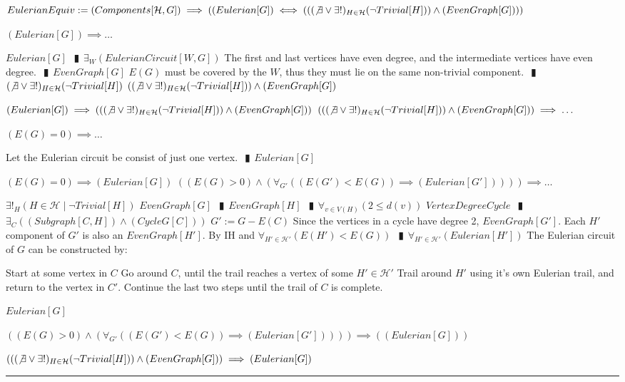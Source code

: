 \documentclass{book}
\newcommand{\abr}{:=}
\newcommand{\pipe}{$\phantom{(}\vrectangleblack\phantom{)}$}
\newcommand{\pr}[1]{\left(#1\right)}
\newcommand{\st}{\mathbin{|}}
\begin{document}
$EulerianEquiv \abr (Components[\mathcal{H}, G]) \implies \pr{(Eulerian[G]) \iff \pr{\pr{(\not \exists \lor \exists!)_{H \in \mathcal{H}}(\lnot Trivial[H])} \land (EvenGraph[G])}}$
\begin{enumerate}
  \lit $(Eulerian[G]) \implies \ldots$
  \begin{enumerate}
    \lit $Eulerian[G]$ \pipe $\exists_{W}(EulerianCircuit[W, G])$
    \lit The first and last vertices have even degree, and the intermediate vertices have even degree. \pipe $EvenGraph[G]$
    \lit $E(G)$ must be covered by the $W$, thus they must lie on the same non-trivial component. \pipe $(\not \exists \lor \exists!)_{H \in \mathcal{H}}(\lnot Trivial[H])$
    \lit $\pr{(\not \exists \lor \exists!)_{H \in \mathcal{H}}(\lnot Trivial[H])} \land (EvenGraph[G])$
  \end{enumerate}
  \lit $(Eulerian[G]) \implies \pr{\pr{(\not \exists \lor \exists!)_{H \in \mathcal{H}}(\lnot Trivial[H])} \land (EvenGraph[G])}$
  \lit $\pr{\pr{(\not \exists \lor \exists!)_{H \in \mathcal{H}}(\lnot Trivial[H])} \land (EvenGraph[G])} \implies \ldots$
  \begin{enumerate}
    \lit $\pr{E(G) = 0} \implies \ldots$
    \begin{enumerate}
      \lit Let the Eulerian circuit be consist of just one vertex. \pipe $Eulerian[G]$
    \end{enumerate}
    \lit $\pr{E(G) = 0} \implies (Eulerian[G])$
    \lit $\pr{\pr{E(G) > 0} \land \pr{\forall_{G'}\pr{\pr{E(G') < E(G)} \implies (Eulerian[G'])}}} \implies \ldots$
    \begin{enumerate}
      \lit $\exists!_{H}(H \in \mathcal{H} \st \lnot Trivial[H])$
      \lit $EvenGraph[G]$ \pipe $EvenGraph[H]$ \pipe $\forall_{v \in V(H)}\pr{2 \leq d(v)}$
      \lit $VertexDegreeCycle$ \pipe $\exists_{C}\pr{(Subgraph[C, H]) \land (CycleG[C])}$
      \lit $G' \abr G - E(C)$
      \lit Since the vertices in a cycle have degree 2, $EvenGraph[G']$. Each $H'$ component of $G'$ is also an $EvenGraph[H']$.
      \lit By IH and $\forall_{H' \in \mathcal{H}'}\pr{E(H') < E(G)}$ \pipe $\forall_{H' \in \mathcal{H}'}(Eulerian[H'])$
      \lit The Eulerian circuit of $G$ can be constructed by:
      \begin{enumerate}
        \lit Start at some vertex in $C$
        \lit Go around $C$, until the trail reaches a vertex of some $H' \in \mathcal{H}'$
        \lit Trail around $H'$ using it's own Eulerian trail, and return to the vertex in $C'$.
        \lit Continue the last two steps until the trail of $C$ is complete.
      \end{enumerate}
      \lit $Eulerian[G]$
    \end{enumerate}
    \lit $\pr{\pr{E(G) > 0} \land \pr{\forall_{G'}\pr{\pr{E(G') < E(G)} \implies (Eulerian[G'])}}} \implies \pr{(Eulerian[G])}$
  \end{enumerate}
  \lit $\pr{\pr{(\not \exists \lor \exists!)_{H \in \mathcal{H}}(\lnot Trivial[H])} \land (EvenGraph[G])} \implies (Eulerian[G])$
\end{enumerate} \vspace{.75mm} \hrule \vspace{.75mm} \ \\
\end{document}
